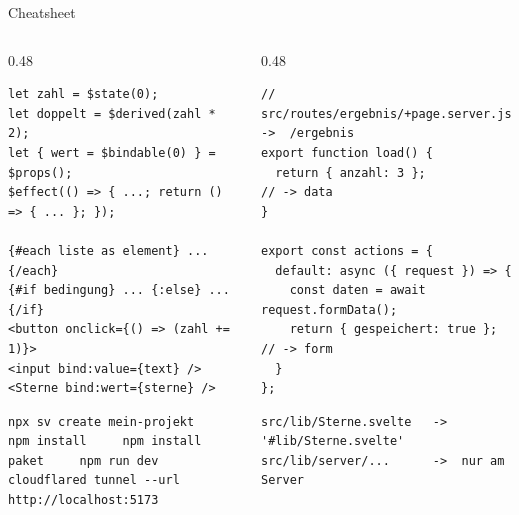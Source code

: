\begin{frame}[fragile]{Cheatsheet}
  \begin{columns}[onlytextwidth,t]
    \begin{column}{0.48\textwidth}
\begin{lstlisting}[style=sveltesm,numbers=none]
let zahl = $state(0);
let doppelt = $derived(zahl * 2);
let { wert = $bindable(0) } = $props();
$effect(() => { ...; return () => { ... }; });

{#each liste as element} ... {/each}
{#if bedingung} ... {:else} ... {/if}
<button onclick={() => (zahl += 1)}>
<input bind:value={text} />
<Sterne bind:wert={sterne} />
\end{lstlisting}
\begin{lstlisting}[style=term,basicstyle=\ttfamily\fontsize{7}{8.2}\selectfont]
npx sv create mein-projekt
npm install     npm install paket     npm run dev
cloudflared tunnel --url http://localhost:5173
\end{lstlisting}
    \end{column}
    \begin{column}{0.48\textwidth}
\begin{lstlisting}[style=jssm,numbers=none]
// src/routes/ergebnis/+page.server.js  ->  /ergebnis
export function load() {
  return { anzahl: 3 };            // -> data
}

export const actions = {
  default: async ({ request }) => {
    const daten = await request.formData();
    return { gespeichert: true };  // -> form
  }
};
\end{lstlisting}
\begin{lstlisting}[style=term,basicstyle=\ttfamily\fontsize{7}{8.2}\selectfont]
src/lib/Sterne.svelte   ->  '#lib/Sterne.svelte'
src/lib/server/...      ->  nur am Server
\end{lstlisting}
    \end{column}
  \end{columns}
\end{frame}

